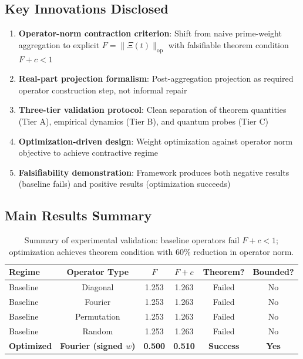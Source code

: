 \documentclass[11pt,a4paper]{article}
\begin{document}
\subsection{Key Innovations Disclosed}

\begin{enumerate}
\item \textbf{Operator-norm contraction criterion}: Shift from naive prime-weight aggregation to explicit \(F = \|\Xi(t)\|_{\mathrm{op}}\) with falsifiable theorem condition \(F+c<1\)
\item \textbf{Real-part projection formalism}: Post-aggregation projection as required operator construction step, not informal repair
\item \textbf{Three-tier validation protocol}: Clean separation of theorem quantities (Tier A), empirical dynamics (Tier B), and quantum probes (Tier C)
\item \textbf{Optimization-driven design}: Weight optimization against operator norm objective to achieve contractive regime
\item \textbf{Falsifiability demonstration}: Framework produces both negative results (baseline fails) and positive results (optimization succeeds)
\end{enumerate}

\subsection{Main Results Summary}

\begin{table}[h]
\centering
\begin{tabular}{lccccc}
\toprule
\textbf{Regime} & \textbf{Operator Type} & \textbf{\(F\)} & \textbf{\(F+c\)} & \textbf{Theorem?} & \textbf{Bounded?} \\
\midrule
Baseline & Diagonal & 1.253 & 1.263 & Failed & No \\
Baseline & Fourier & 1.253 & 1.263 & Failed & No \\
Baseline & Permutation & 1.253 & 1.263 & Failed & No \\
Baseline & Random & 1.253 & 1.263 & Failed & No \\
\midrule
\textbf{Optimized} & \textbf{Fourier (signed \(w\))} & \textbf{0.500} & \textbf{0.510} & \textbf{Success} & \textbf{Yes} \\
\bottomrule
\end{tabular}
\caption{Summary of experimental validation: baseline operators fail \(F+c<1\); optimization achieves theorem condition with 60\% reduction in operator norm.}
\label{tab:exec-summary}
\end{table}
\end{document}
